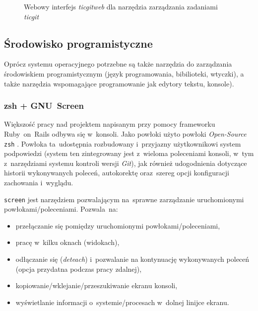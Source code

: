 \begin{figure}[ht]
\centering
{}
\caption{Webowy interfejs \textit{ticgitweb} dla narzędzia zarządzania zadaniami \textit{ticgit}}
\end{figure}

\subsection{Środowisko programistyczne}

Oprócz systemu operacyjnego potrzebne są także narzędzia do zarządzania środowiskiem programistycznym (język programowania, bibilioteki, wtyczki), a także narzędzia wspomagające programowanie jak edytory tekstu, konsole).

\subsubsection{zsh + GNU~Screen}

Większość pracy nad projektem napisanym przy pomocy frameworku Ruby~on~Rails odbywa się w~konsoli. Jako powłoki użyto powłoki \textit{Open-Source} \texttt{zsh} \cite{zsh}. Powłoka ta~udostępnia rozbudowany i~przyjazny użytkownikowi system podpowiedzi (system ten zintegrowany jest z~wieloma poleceniami konsoli, w~tym z~narzędziami systemu kontroli wersji \textit{Git}), jak również udogodnienia dotyczące historii wykonywanych poleceń, autokorektę oraz~szereg opcji konfiguracji zachowania i~wyglądu.


\texttt{screen} \cite{screen} jest narzędziem pozwalającym na~sprawne zarządzanie uruchomionymi powłokami/poleceniami. Pozwala~na:

\begin{itemize}
  \item przełączanie się pomiędzy uruchomionymi powłokami/poleceniami,
  \item pracę w~kilku oknach (widokach),
  \item odłączanie się (\textit{deteach}) i~pozwalanie na kontynuację wykonywanych poleceń (opcja przydatna podczas pracy zdalnej),
  \item kopiowanie/wklejanie/przeszukiwanie ekranu konsoli,
  \item wyświetlanie informacji o~systemie/procesach w~dolnej linijce ekranu.
\end{itemize}

